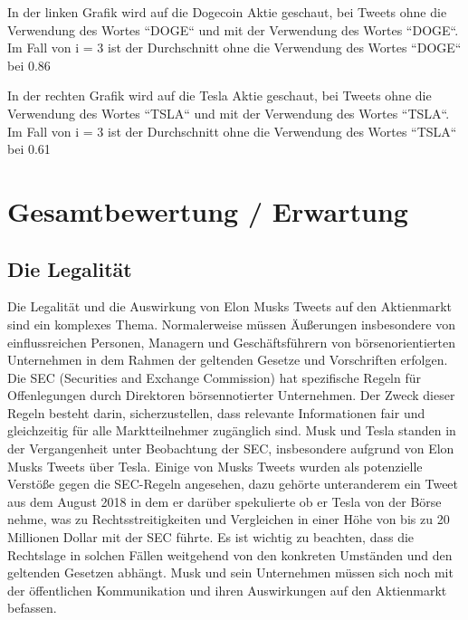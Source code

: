 \documentclass{article}
\begin{document}
In der linken Grafik wird auf die Dogecoin Aktie geschaut, bei Tweets ohne die Verwendung des Wortes “DOGE“ und mit der Verwendung des Wortes “DOGE“. Im Fall von i = 3 ist der Durchschnitt ohne die Verwendung des Wortes “DOGE“ bei 0.86 %

In der rechten Grafik wird auf die Tesla Aktie geschaut, bei Tweets ohne die Verwendung des Wortes “TSLA“ und mit der Verwendung des Wortes “TSLA“. Im Fall von i = 3 ist der Durchschnitt ohne die Verwendung des Wortes “TSLA“ bei 0.61 %


\section{Gesamtbewertung / Erwartung}
\subsection{Die Legalität}
Die Legalität und die Auswirkung von Elon Musks Tweets auf den Aktienmarkt sind ein komplexes Thema. Normalerweise müssen Äußerungen insbesondere von einflussreichen Personen, Managern und Geschäftsführern von börsenorientierten Unternehmen in dem Rahmen der geltenden Gesetze und Vorschriften erfolgen.
Die SEC (Securities and Exchange Commission) hat spezifische Regeln für Offenlegungen durch
Direktoren börsennotierter Unternehmen. Der Zweck dieser Regeln besteht darin, sicherzustellen,
dass relevante Informationen fair und gleichzeitig für alle Marktteilnehmer zugänglich sind. Musk und Tesla standen in der Vergangenheit unter Beobachtung der SEC, insbesondere aufgrund von Elon Musks Tweets über Tesla. Einige von Musks Tweets wurden als potenzielle Verstöße gegen die SEC-Regeln angesehen, dazu gehörte unteranderem ein Tweet aus dem August 2018 in dem er darüber spekulierte ob er Tesla von der Börse nehme, was zu Rechtsstreitigkeiten und Vergleichen in einer Höhe von bis zu 20 Millionen Dollar mit der SEC führte. Es ist wichtig zu beachten, dass die Rechtslage in solchen Fällen weitgehend von den konkreten Umständen und den
geltenden Gesetzen abhängt. Musk und sein Unternehmen müssen sich noch mit der öffentlichen
Kommunikation und ihren Auswirkungen auf den Aktienmarkt befassen.
\end{document}
